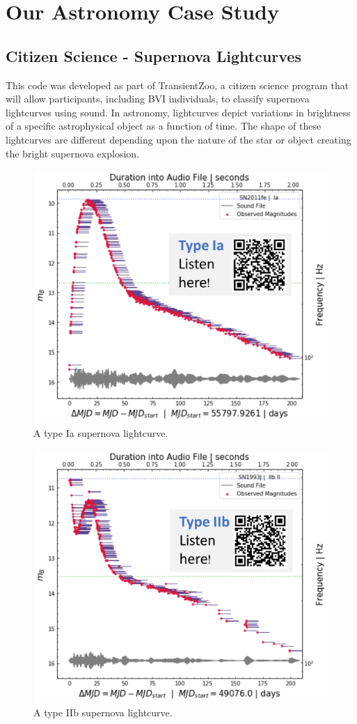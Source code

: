 \documentclass[]{acmsiggraph}
\begin{document}
\section{Our Astronomy Case Study}
\subsection{Citizen Science - Supernova Lightcurves}
This code was developed as part of TransientZoo, a citizen science program that will allow participants, including BVI individuals, to classify supernova lightcurves using sound. In astronomy, lightcurves depict variations in brightness of a specific astrophysical object as a function of time. The shape of these lightcurves are different depending upon the nature of the star or object creating the bright supernova explosion.


\begin{figure}[h]
\centering
\includegraphics[width=.7\linewidth]{paper/images/Ia.png}
\caption{A type Ia supernova lightcurve.}
\label{fig:Ia}
\end{figure}

\begin{figure}[h]
\centering
\includegraphics[width=.7\linewidth]{paper/images/IIb.png}
\caption{A type IIb supernova lightcurve.}
\label{fig:IIb}
\end{figure}
\end{document}
